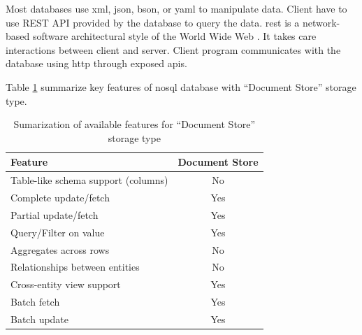 Most databases use \gls{xml}, \gls{json}, \gls{bson}, or \gls{yaml} to manipulate data.
Client have to use REST API provided by the database to query the data.
\gls{rest} is a network-based software architectural style of the World Wide Web \cite{doglio, masse_2012}.
It takes care interactions between client and server.
Client program communicates with the database using \gls{http} through exposed \glspl{api}.

Table \ref{tbl:doctype-storage-feature} summarize key features of \gls{nosql} database with \enquote{Document Store} storage type.
\begin{table}[h]
	\centering
	\begin{tabular}{l c}
		\hline
		Feature                             &      Document Store \\
		\hline
		Table-like schema support (columns) &      No \\
		Complete update/fetch               &      Yes \\
		Partial update/fetch                &      Yes \\
		Query/Filter on	value               &      Yes \\
		Aggregates across rows              &      No \\
		Relationships between entities      &      No \\
		Cross-entity view support           &      Yes \\
		Batch fetch                         &      Yes \\
		Batch update                        &      Yes \\
		\hline
	\end{tabular}
	\caption{Sumarization of available features for \enquote{Document Store} storage type  \cite{vaish_2013}}
	\label{tbl:doctype-storage-feature}
\end{table}

